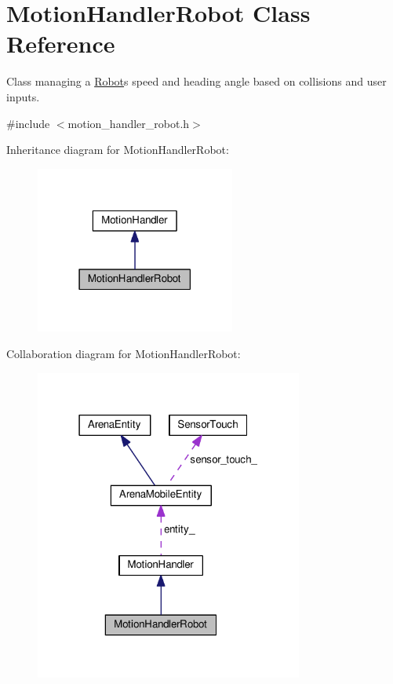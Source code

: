 \hypertarget{classMotionHandlerRobot}{}\section{Motion\+Handler\+Robot Class Reference}
\label{classMotionHandlerRobot}


Class managing a \hyperlink{classRobot}{Robot}\textquotesingle{}s speed and heading angle based on collisions and user inputs.  




{\ttfamily \#include $<$motion\+\_\+handler\+\_\+robot.\+h$>$}



Inheritance diagram for Motion\+Handler\+Robot\+:
\nopagebreak
\begin{figure}[H]
\begin{center}
\leavevmode
\includegraphics[width=186pt]{classMotionHandlerRobot__inherit__graph}
\end{center}
\end{figure}


Collaboration diagram for Motion\+Handler\+Robot\+:
\nopagebreak
\begin{figure}[H]
\begin{center}
\leavevmode
\includegraphics[width=250pt]{classMotionHandlerRobot__coll__graph}
\end{center}
\end{figure}
